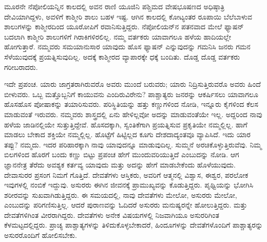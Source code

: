 ಮೂರನೇ ನೆಪೋಲಿಯನ್ನಿನ ಕಾಲದಲ್ಲಿ ಅವನ ರಾಣಿ ಯೂಜಿನಿ ಪಶ್ಚಿಮದ ವೇಷಭೂಷಣದ ಅಧಿಷ್ಠಾತ್ರಿ ದೇವಿಯಾಗಿದ್ದಳು, ಅವಳಿಗೆ ಕಾಶ್ಮೀರಿ ಶಾಲು ಬಹಳ ಇಷ್ಟ. ಆಗಿನ ಕಾಲದಲ್ಲಿ ಕೋಟ್ಯಂತರ ರೂಪಾಯಿ ಬೆಲೆಬಾಳುವ ಶಾಲುಗಳನ್ನು ಕಾಶ್ಮೀರದಿಂದ ಯೂರೋಪಿಗೆ ರವಾನಿಸುತ್ತಿದ್ದರು. ನೆಪೋಲಿಯನ್​ನ ಪತನ\break ವಾದ ಮೇಲೆ ಫ್ಯಾಷನ್​ ಬದಲಾಗಿ ಕಾಶ್ಮೀರಿ ಶಾಲುಗಳಿಗೆ ಗಿರಾಕಿಗಳಿರಲಿಲ್ಲ. ನಮ್ಮ ವರ್ತಕರು ಯಾವಾಗಲೂ ಹಳೆಯ ಹಾದಿಯಲ್ಲೇ ಹೋಗುತ್ತಾರೆ. ನಮ್ಮವರು ಸಮಯಾನುಸಾರ ಯಾವುದು ಹೊಸ ಫ್ಯಾಷನ್​ ಎನ್ನುವುದನ್ನು ಗಮನಿಸಿ ಜನರು ಗಮನ ಸೆಳೆಯುವುದಕ್ಕೆ ಪ್ರಯತ್ನಿಸುವುದಿಲ್ಲ. ಅದಕ್ಕೆ ಕಾಶ್ಮೀರದ ವ್ಯಾಪಾರಕ್ಕೇ ಧಕ್ಕೆ ಬಂದಿತು. ದೊಡ್ಡ ದೊಡ್ಡ ವರ್ತಕರು ಗರೀಬರಾದರು.

ಇದೇ ಪ್ರಪಂಚ. ಯಾರು ಜಾಗ್ರತರಾಗಿರುವರೊ ಅವರು ಮುಂದೆ ಬರುವರು; ಯಾರು ನಿದ್ರಿಸುತ್ತಿರುವರೊ ಅವರು ಹಿಂದೆ ಬೀಳುವರು. ಒಬ್ಬ ಮತ್ತೊಬ್ಬನಿಗೆ ಕಾಯುವನು ಎಂದಿರುವಿರೇನು? ಪಾಶ್ಚಾತ್ಯರು ಜನರನ್ನು ಆಕರ್ಷಿಸಲು ಯಾವಾಗಲೂ ಹೊಸಹೊಸ ಪೋಷಾಕನ್ನು ತಯಾರಿಸುವರು. ಪರಿಸ್ಥಿತಿಯನ್ನು ಹತ್ತು ಕಣ್ಣುಗಳಿಂದ ನೋಡಿ, ಇನ್ನೂರು ಕೈಗಳಿಂದ ಕೆಲಸ ಮಾಡುವಂತೆ ಇರುವರು. ನಮ್ಮವರು ಶಾಸ್ತ್ರದಲ್ಲಿ ಏನು ಹೇಳಿಲ್ಲವೋ ಅದನ್ನು ಮಾಡುವಂತೆಯೇ ಇಲ್ಲ. ಅದ್ದರಿಂದ ನಾವು ಹಳೆಯ ಜಾಡಿನಲ್ಲಿಯೇ ಸುತ್ತುತ್ತಿದ್ದೇವೆ. ಹೊಸದಕ್ಕಾಗಿ, ಸ್ವಂತಿಕೆಗಾಗಿ ಪ್ರಯತ್ನಿಸುವ ಪ್ರಕೃತಿಯೇ ನಮ್ಮಲ್ಲಿಲ್ಲ. ಹಾಗೆ ಮಾಡಲು ಬೇಕಾದ ಶಕ್ತಿಯೇ ನಮ್ಮಲ್ಲಿಲ್ಲ. ಹೊಟ್ಟೆಗೆ ಹಿಟ್ಟಿಲ್ಲದ ಕೂಗು ದೇಶದಾದ್ಯಂತವೂ ವ್ಯಾಪಿಸಿದೆ. ಇದು ಯಾರ ತಪ್ಪು? ನಮ್ಮದು. ಇದರ ಪರಿಹಾರಕ್ಕಾಗಿ ನಾವು ಯಾವುದನ್ನೂ ಮಾಡುವುದಿಲ್ಲ. ಸುಮ್ಮನೆ ಅರಚಿಕೊಳ್ಳುತ್ತಿರುವೆವು. ನಿಮ್ಮ ಬಿಲಗಳಿಂದ ಹೊರಗೆ ಬಂದು ಕಣ್ಣು ಬಿಟ್ಟು ಪ್ರಪಂಚ ಹೇಗೆ ಮುಂದುವರಿಯುತ್ತಿದೆ ಎಂಬುದನ್ನು ನೋಡಿ. ಆಗ ಜ್ಞಾನನೇತ್ರ ತೆರೆದು ಅವಶ್ಯಕ ಕರ್ತವ್ಯ ಯಾವುದು ಮತ್ತು ಅದನ್ನು ಹೇಗೆ ಮಾಡಬೇಕೆಂದು ಹೊಳೆಯುವುದು. ದೇವಾಸುರರ ಪ್ರಸಂಗ ನಿಮಗೆ ಗೊತ್ತಿದೆ. ದೇವತೆಗಳು ಆಸ್ತಿಕರು, ಅವರಿಗೆ ಆತ್ಮನಲ್ಲಿ ವಿಶ್ವಾಸ, ಈಶ್ವರ, ಪರಲೋಕ ಇವುಗಳಲ್ಲಿ ನಂಬಿಕೆ ಇದ್ದುವು. ಅಸುರರು ಈಗಿನ ಜೀವನಕ್ಕೆ ಪ್ರಾಮುಖ್ಯವನ್ನು ಕೊಡುತ್ತಿದ್ದರು. ಪೃಥ್ವಿಯನ್ನು ಭೋಗಿಸಿ ಶರೀರವನ್ನು ಸುಖವಾಗಿಡುತ್ತಿದ್ದರು. ಈ ಸಮಯದಲ್ಲಿ, ನಾವು ದೇವತೆಗಳು ಮೇಲೋ, ಅಸುರರು ಮೇಲೋ, ಎಂಬುದನ್ನು ಪರಿಗಣಿಸುತ್ತಿಲ್ಲ. ಆದರೆ ಪುರಾಣವನ್ನು ಓದಿದರೆ ಅಸುರರು ಮನುಷ್ಯರನ್ನೇ ಹೋಲುತ್ತಿದ್ದರು. ಮತ್ತು ದೇವತೆಗಳಿಗಿಂತ ವೀರರಾಗಿದ್ದರು. ದೇವತೆಗಳು ಅನೇಕ ವಿಷಯಗಳಲ್ಲಿ ನಿಜವಾಗಿಯೂ ಅಸುರರಿಗಿಂತ ಕೆಳಮಟ್ಟದಲ್ಲಿದ್ದರು. ಪ್ರಾಚ್ಯ ಪಾಶ್ಚಾತ್ಯಗಳನ್ನು ತಿಳಿದುಕೊಳ್ಳಬೇಕಾದರೆ, ಹಿಂದೂಗಳನ್ನು ದೇವತೆಗಳೊಂದಿಗೆ ಪಾಶ್ಚಾತ್ಯರನ್ನು ಅಸುರರೊಂದಿಗೆ ಹೋಲಿಸಬೇಕು.

